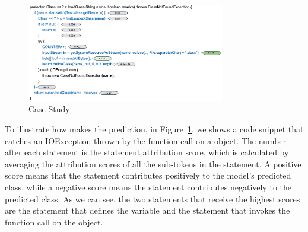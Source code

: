 \begin{figure}[t]
 	\centering
 	\includegraphics[width=3.4in]{rq1-case-study.png}
        \vspace{-20pt}
 	\caption{{\xblock} Case Study}
 	\label{fig:rq1-case}	
\end{figure}

To illustrate how {\xblock} makes the prediction, in Figure~\ref{fig:rq1-case}, we shows a code snippet that catches an IOException thrown by the  function call on a  object. The number after each statement is the statement attribution score, which is calculated by averaging the attribution scores of all the sub-tokens in the statement. A positive score means that the statement contributes positively to the model's predicted class, while a negative score means the statement contributes negatively to the predicted class.  As we can see, the two statements that receive the highest scores are the statement that defines the  variable and the statement that invokes the  function call on the  object. 